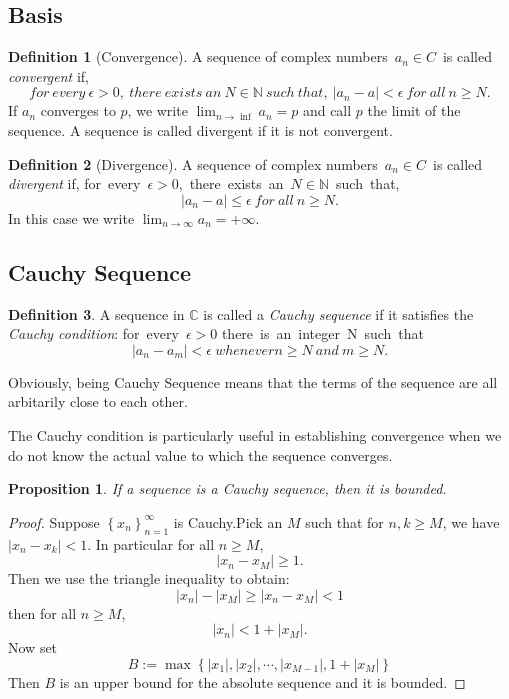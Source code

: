\documentclass{article}
\newtheorem{prop}[theorem]{Proposition}
\theoremstyle{definition}
\newtheorem{defi}{Definition}[section]
\begin{document}
\subsection{Basis}

\begin{defi}[Convergence]
A sequence of complex numbers\ $a_{n}\in C$\ is called \textit{convergent} if,
$$for\ every\ \epsilon>0,\ there\ exists\ an\ N\in\mathbb{N}\ such\ that,\
|a_{n}-a|<\epsilon\ for\ all\ n\geq N.$$
If ${a_{n}}$ converges to $p$, we write $\lim_{n\rightarrow\inf}a_{n}=p$ and call
$p$ the limit of the sequence. A sequence is called divergent if it is not convergent.
\end{defi}


\begin{defi}[Divergence]
A sequence of complex numbers\ $a_{n}\in C$\ is called \textit{divergent} if,
for\ every\ $\epsilon>0$,\ there\ exists\ an\ $N\in\mathbb{N}$\ such\ that,
$$|a_{n}-a|\leq\epsilon\ for\ all\ n\geq N.$$
In this case we write $\lim_{n\rightarrow\infty}a_{n}=+\infty$.
\end{defi}

\subsection{Cauchy Sequence}

\begin{defi}
A sequence in $\mathbb{C}$ is called a \textit{Cauchy sequence} if it satisfies the 
\textit{Cauchy condition}:
for\ every\ $\epsilon>0$ there\ is\ an\ integer\ N\ such\ that\
$$|a_{n}-a_{m}|<\epsilon\ whenever n\geq N\ and\ m\geq N.$$
\end{defi}

Obviously, being Cauchy Sequence means that the terms 
of the sequence are all arbitarily close to each other.

The Cauchy condition is particularly useful in establishing 
convergence when we do not know the actual value to which 
the sequence converges.

\begin{prop}
If a sequence is a Cauchy sequence, then it is bounded.
\end{prop}

\begin{proof}
    Suppose $\left\{x_{n}\right\}_{n=1}^{\infty}$ is Cauchy.Pick an $M$ 
    such that for $n,k\geq M$, we have $|x_{n}-x_{k}|<1$. In particular 
    for all $n\geq M$, $$|x_{n}-x_{M}|\geq 1.$$
    Then we use the triangle inequality to obtain:
    $$|x_{n}|-|x_{M}|\geq |x_{n}-x_{M}| <1$$
    then for all $n\geq M$, $$|x_{n}|<1+|x_{M}|.$$
    Now set 
    $$B:=\max\left\{|x_{1}|,|x_{2}|,\cdots,|x_{M-1}|,1+|x_{M}|\right\}$$
    Then $B$ is an upper bound for the absolute sequence and it is bounded.
\end{proof}
\end{document}
